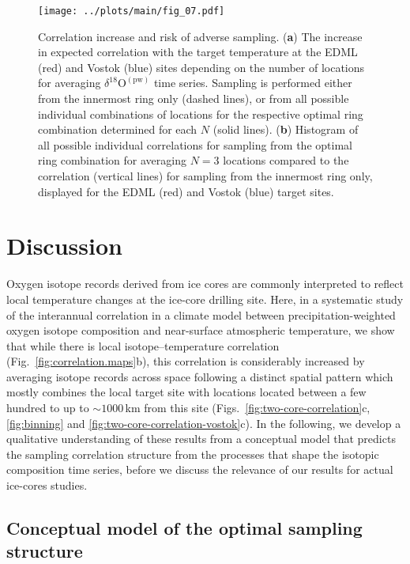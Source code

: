 \documentclass[cp, manuscript]{copernicus}
\begin{document}
\begin{figure*}[t]%
\centering
\texttt{[image: ../plots/main/fig\_07.pdf]}
\caption{%
  Correlation increase and risk of adverse sampling. (\textbf{a}) The increase
  in expected correlation with the target temperature at the EDML (red) and
  Vostok (blue) sites depending on the number of locations for averaging
  $\delta^{18}\mathrm{O}^{\mathrm{(pw)}}$ time series. Sampling is performed
  either from the innermost ring only (dashed lines), or from all possible
  individual combinations of locations for the respective optimal ring
  combination determined for each $N$ (solid lines). (\textbf{b}) Histogram of
  all possible individual correlations for sampling from the optimal ring
  combination for averaging $N=3$ locations compared to the correlation
  (vertical lines) for sampling from the innermost ring only, displayed for the
  EDML (red) and Vostok (blue) target sites.}
\label{fig:cor.increase.risk}%
\end{figure*}%

\section{Discussion}\label{discussion}

Oxygen isotope records derived from ice cores are commonly interpreted to
reflect local temperature changes at the ice-core drilling site. Here, in a
systematic study of the interannual correlation in a climate model between
precipitation-weighted oxygen isotope composition and near-surface atmospheric
temperature, we show that while there is local isotope--temperature correlation
(Fig.~\ref{fig:correlation.maps}b), this correlation is considerably increased
by averaging isotope records across space following a distinct spatial pattern
which mostly combines the local target site with locations located between a few
hundred to up to $\sim1000$\,km from this site
(Figs.~\ref{fig:two-core-correlation}c, \ref{fig:binning} and
\ref{fig:two-core-correlation-vostok}c). In the following, we develop a
qualitative understanding of these results from a conceptual model that predicts
the sampling correlation structure from the processes that shape the isotopic
composition time series, before we discuss the relevance of our results for
actual ice-cores studies.

\subsection{Conceptual model of the optimal sampling structure}
\label{discussion:concept.model}
\end{document}
